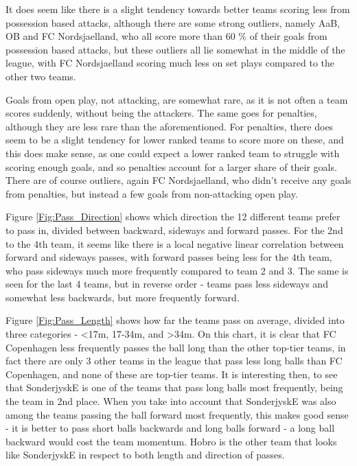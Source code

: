 \documentclass[Report.tex]{subfiles}
\begin{document}
It does seem like there is a slight tendency towards better teams scoring less
from possession based attacks, although there are some strong outliers, namely
AaB, OB and FC Nordsjaelland, who all score more than 60 \% of their
goals from possession based attacks, but these outliers all lie somewhat in the
middle of the league, with FC Nordsjaelland scoring much less on set plays
compared to the other two teams. 

Goals from open play, not attacking, are somewhat rare, as it is not often a
team scores suddenly, without being the attackers. The same goes for penalties,
although they are less rare than the aforementioned. For penalties, there does
seem to be a slight tendency for lower ranked teams to score more on these, and
this does make sense, as one could expect a lower ranked team to struggle with
scoring enough goals, and so penalties account for a larger share of their
goals. There are of course outliers, again FC Nordsjaelland, who didn't receive
any goals from penalties, but instead a few goals from non-attacking open play. 

Figure \ref{Fig:Pass_Direction} shows which direction the 12 different teams prefer to pass in,
divided between backward, sideways and forward passes. For the 2nd to the 4th
team, it seems like there is a local negative linear correlation between forward
and sideways passes, with forward passes being less for the 4th team, who pass
sideways much more frequently compared to team 2 and 3. The same is seen for the
last 4 teams, but in reverse order - teams pass less sideways and somewhat less
backwards, but more frequently forward. 

Figure \ref{Fig:Pass_Length} shows how far the teams pass on average, divided into three
categories - <17m, 17-34m, and >34m. 
On this chart, it is clear that FC Copenhagen less frequently passes the ball
long than the other top-tier teams, in fact there are only 3 other teams in the
league that pass less long balls than FC Copenhagen, and none of these are
top-tier teams. It is interesting then, to see that SonderjyskE is one of the
teams that pass long balls most frequently, being the team in 2nd place. When
you take into account that SonderjyskE was also among the teams passing the ball
forward most frequently, this makes good sense - it is better to pass short
balls backwards and long balls forward - a long ball backward would cost the
team momentum. Hobro is the other team that looks like SonderjyskE in respect to
both length and direction of passes. 
\end{document}
